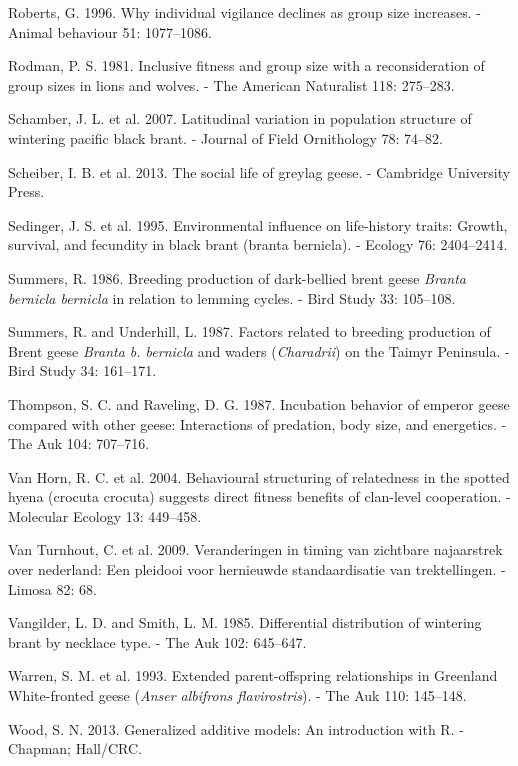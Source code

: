 \documentclass[10pt,twocolumn]{paper}
\begin{document}
\hypertarget{ref-roberts1996individual}{}
Roberts, G. 1996. Why individual vigilance declines as group size
increases. - Animal behaviour 51: 1077--1086.

\hypertarget{ref-rodman1981lions}{}
Rodman, P. S. 1981. Inclusive fitness and group size with a
reconsideration of group sizes in lions and wolves. - The American
Naturalist 118: 275--283.

\hypertarget{ref-JOFO:JOFO087}{}
Schamber, J. L. et al. 2007. Latitudinal variation in population
structure of wintering pacific black brant. - Journal of Field
Ornithology 78: 74--82.

\hypertarget{ref-scheiber2013social}{}
Scheiber, I. B. et al. 2013. The social life of greylag geese. -
Cambridge University Press.

\hypertarget{ref-ECY:ECY19957682404}{}
Sedinger, J. S. et al. 1995. Environmental influence on life-history
traits: Growth, survival, and fecundity in black brant (branta
bernicla). - Ecology 76: 2404--2414.

\hypertarget{ref-summers1986breeding}{}
Summers, R. 1986. Breeding production of dark-bellied brent geese
\emph{Branta bernicla bernicla} in relation to lemming cycles. - Bird
Study 33: 105--108.

\hypertarget{ref-summers1987factors}{}
Summers, R. and Underhill, L. 1987. Factors related to breeding
production of Brent geese \emph{Branta b. bernicla} and waders
(\emph{Charadrii}) on the Taimyr Peninsula. - Bird Study 34: 161--171.

\hypertarget{ref-thompson1987emperor}{}
Thompson, S. C. and Raveling, D. G. 1987. Incubation behavior of emperor
geese compared with other geese: Interactions of predation, body size,
and energetics. - The Auk 104: 707--716.

\hypertarget{ref-MEC:MEC2071}{}
Van Horn, R. C. et al. 2004. Behavioural structuring of relatedness in
the spotted hyena (crocuta crocuta) suggests direct fitness benefits of
clan-level cooperation. - Molecular Ecology 13: 449--458.

\hypertarget{ref-van2009veranderingen}{}
Van Turnhout, C. et al. 2009. Veranderingen in timing van zichtbare
najaarstrek over nederland: Een pleidooi voor hernieuwde standaardisatie
van trektellingen. - Limosa 82: 68.

\hypertarget{ref-vangilder1985differential}{}
Vangilder, L. D. and Smith, L. M. 1985. Differential distribution of
wintering brant by necklace type. - The Auk 102: 645--647.

\hypertarget{ref-10.2307ux2f4088245}{}
Warren, S. M. et al. 1993. Extended parent-offspring relationships in
Greenland White-fronted geese (\emph{Anser albifrons flavirostris}). -
The Auk 110: 145--148.

\hypertarget{ref-wood2013gam}{}
Wood, S. N. 2013. Generalized additive models: An introduction with R. -
Chapman; Hall/CRC.
\end{document}
